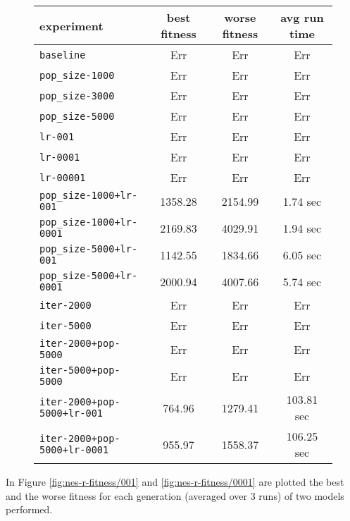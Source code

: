 \begin{figure}[htb]
	\centering
	
	\begin{tabular}{lccc}
		\toprule
		\textbf{experiment} & \textbf{best fitness} & \textbf{worse fitness} & \textbf{avg run time} \\
		\midrule
		\texttt{baseline 						} &	   Err &	    Err &	       Err \\
		\texttt{pop\_size-1000 					}    &	   Err &	    Err &	       Err \\
		\texttt{pop\_size-3000 					}    &	   Err &	    Err &	       Err \\
		\texttt{pop\_size-5000 					}    &	   Err &	    Err &	       Err \\
		\texttt{lr-001 							}   &	   Err &	    Err &	       Err \\
		\texttt{lr-0001	 						}  &	   Err &	    Err &	       Err \\
		\texttt{lr-00001	 					} &	   Err &	    Err &	       Err \\
		\texttt{pop\_size-1000+lr-001 			} &              1358.28 &	2154.99 &	  1.74 sec \\
		\texttt{pop\_size-1000+lr-0001 			} &              2169.83 &	4029.91 &	  1.94 sec \\
		\texttt{pop\_size-5000+lr-001 			} &              1142.55 &	1834.66 &	  6.05 sec \\
		\texttt{pop\_size-5000+lr-0001 			} &              2000.94 &	4007.66 &	  5.74 sec \\
		\texttt{iter-2000 						}  &	   Err &	    Err &	       Err \\
		\texttt{iter-5000 						}  &	   Err &	    Err &	       Err \\
		\texttt{iter-2000+pop-5000 	}			  &	   Err &	    Err &	       Err \\
		\texttt{iter-5000+pop-5000 	}			  &	   Err &	    Err &	       Err \\
		\texttt{iter-2000+pop-5000+lr-001 }		  &	764.96 &	1279.41 &	103.81 sec \\
		\texttt{iter-2000+pop-5000+lr-0001 }	  &	955.97 &	1558.37 &	106.25 sec \\
		\bottomrule
	\end{tabular}
	\label{tab:nes-performance-r}
\end{figure}

In Figure \ref{fig:nes-r-fitness/001} and \ref{fig:nes-r-fitness/0001} are plotted the best and the worse fitness for each generation (averaged over 3 runs) of two models performed.

